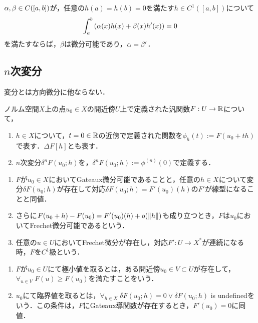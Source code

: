 \documentclass[uplatex,dvipdfmx]{jsreport}
\begin{document}
\begin{lemma}[部分積分の公式の逆]
    $\alpha,\beta\in C([a,b])$が，任意の$h(a)=h(b)=0$を満たす$h\in C^1([a,b])$について
    \[\int^b_a\left(\alpha(x)h(x)+\beta(x)h'(x)\right)=0\]
    を満たすならば，$\beta$は微分可能であり，$\alpha=\beta'$．
\end{lemma}

\subsection{$n$次変分}

\begin{tcolorbox}[colframe=ForestGreen, colback=ForestGreen!10!white,breakable,colbacktitle=ForestGreen!40!white,coltitle=black,fonttitle=\bfseries\sffamily,
title=]
    変分とは方向微分に他ならない．
\end{tcolorbox}

\begin{definition}[$n$-th variation]
    ノルム空間$X$上の点$u_0\in X$の開近傍$U$上で定義された汎関数$F:U\to\mathbb{R}$について，
    \begin{enumerate}
        \item $h\in X$について，$t=0\in\mathbb{R}$の近傍で定義された関数を$\phi_h(t):=F(u_0+th)$で表す．$\Delta F[h]$とも表す．
        \item $n$次変分$\delta^nF(u_0;h)$を，$\delta^nF(u_0;h):=\phi^{(n)}(0)$で定義する．
    \end{enumerate}
\end{definition}

\begin{lemma}[微分との関係]\mbox{}
    \begin{enumerate}
        \item $F$が$u_0\in X$においてGateaux微分可能であることと，任意の$h\in X$について変分$\delta F(u_0;h)$が存在して対応$\delta F(u_0;h)=F'(u_0)(h)$の$F'$が線型になることと同値．
        \item さらに$F(u_0+h)-F(u_0)=F'(u_0)(h)+o(\|h\|)$も成り立つとき，$F$は$u_0$においてFrechet微分可能であるという．
        \item 任意の$u\in U$においてFrechet微分が存在し，対応$F':U\to X^*$が連続になる時，$F$を$C^1$級という．
    \end{enumerate}
\end{lemma}

\begin{definition}\mbox{}
    \begin{enumerate}
        \item $F$が$u_0\in U$にて極小値を取るとは，ある開近傍$u_0\in V\subset U$が存在して，$\forall_{u\in V}\;F(u)\ge F(u_0)$を満たすことをいう．
        \item $u_0$にて臨界値を取るとは，$\forall_{h\in X}\;\delta F(u_0;h)=0\lor\delta F(u_0;h)$ is undefinedをいう．この条件は，$F$にGateaux導関数が存在するとき，$F'(u_0)=0$に同値．
    \end{enumerate}
\end{definition}
\end{document}
